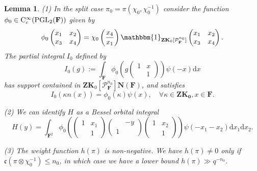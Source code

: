 \documentclass[A4]{amsart}
\def\leq{\leqslant}
\newtheorem{lemma}      [theorem]{Lemma}
\numberwithin{equation}{section} \everymath{\displaystyle}
\newcommand{\Cont}{{\rm C}}
\newcommand{\gp}[1]{\mathbf{#1}}
\newcommand{\PGL}{{\rm PGL}}
\newcommand{\id}{\mathbbm{1}}
\newcommand{\ud}{\mathrm{d}}
\newcommand{\F}{\mathbf{F}}
\newcommand{\vP}{\mathcal{P}}
\newcommand{\cond}{\mathfrak{c}}
\begin{document}
\begin{lemma} \label{lem: WtFNonSC}
	(1) In the split case $\pi_0 = \pi(\chi_0,\chi_0^{-1})$ consider the function $\phi_0 \in \Cont_c^{\infty}(\PGL_2(\F))$ given by
	$$ \phi_0 \begin{pmatrix} x_1 & x_2 \\ x_3 & x_4 \end{pmatrix} = \chi_0 \left( \frac{x_4}{x_1} \right) \id_{\gp{Z}\gp{K}_0[\vP_{\F}^{n_0}]} \begin{pmatrix} x_1 & x_2 \\ x_3 & x_4 \end{pmatrix}. $$
	The partial integral $I_0$ defined by
	$$ I_0(g) := \int_{\F} \phi_0 \left( g \begin{pmatrix} 1 & x \\ & 1 \end{pmatrix} \right) \psi(-x) \ud x $$
has support contained in $\gp{Z}\gp{K}_0[\vP_{\F}^{n_0}] \gp{N}(\F)$, and satisfies
	$$ I_0(\kappa n(x)) = \phi_0(\kappa) \psi(x), \quad \forall \kappa \in \gp{Z}\gp{K_0}, x \in \F. $$	

\noindent (2) We can identify $H$ as a Bessel orbital integral
	$$ H(y) = \int_{\F^2} \phi_0 \left( \begin{pmatrix} 1 & x_1 \\ & 1 \end{pmatrix} \begin{pmatrix} & -y \\ 1 & \end{pmatrix} \begin{pmatrix} 1 & x_2 \\ & 1 \end{pmatrix} \right) \psi(-x_1-x_2) \ud x_1 \ud x_2. $$
	
\noindent (3) The weight function $h(\pi)$ is non-negative. We have $h(\pi) \neq 0$ only if $\cond(\pi \otimes \chi_0^{-1}) \leq n_0$, in which case we have a lower bound $h(\pi) \gg q^{-n_0}$.
\end{lemma}
\end{document}
